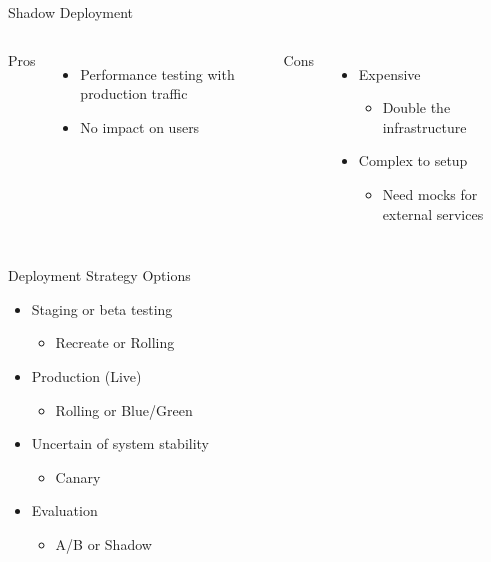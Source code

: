 \documentclass{slide}
\begin{document}
\begin{frame}{Shadow Deployment}
    \vspace{1pt}
    \begin{columns}[t]
      \huge Pros
      {\LARGE
        \begin{itemize}
            \item Performance testing with production traffic
            \item No impact on users
        \end{itemize}
      }
      \huge Cons
      {\LARGE
        \begin{itemize}
            \item Expensive
            \begin{itemize}
                \Large\item Double the infrastructure
            \end{itemize}
            \vspace{2mm}
            \item Complex to setup
            \begin{itemize}
                \Large\item Need mocks for external services
            \end{itemize}
        \end{itemize}
      }
    \end{columns}
\end{frame}

\begin{frame}{Deployment Strategy Options}
  \vspace{1pt}
  {\huge
    \begin{itemize}
        \item Staging or beta testing
        \begin{itemize}
            \LARGE\item Recreate or Rolling
        \end{itemize}
        \vspace{1mm}
        \item Production (Live)
        \begin{itemize}
            \LARGE\item Rolling or Blue/Green
        \end{itemize}
        \vspace{1mm}
        \item Uncertain of system stability
        \begin{itemize}
            \LARGE\item Canary
        \end{itemize}
        \vspace{1mm}
        \item Evaluation
        \begin{itemize}
            \LARGE\item A/B or Shadow
        \end{itemize}
    \end{itemize}
  }
\end{frame}
\end{document}
